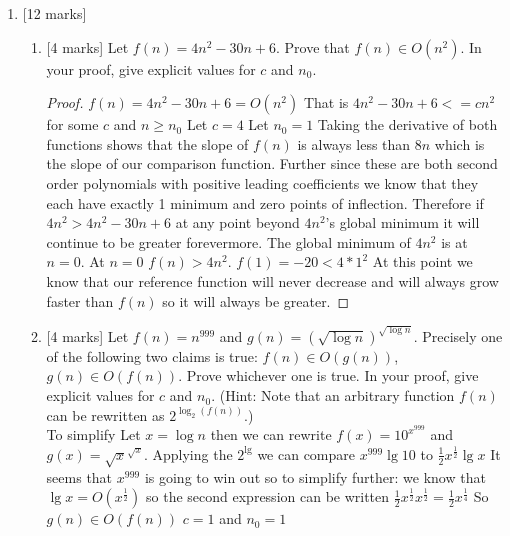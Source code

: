 \documentclass{article}
\begin{document}
\begin{enumerate}
    \item {[12 marks]} 
    \begin{enumerate}
        \item {[4 marks]} Let $f(n)=4n^2-30n+6$. Prove that $f(n)\in O(n^2)$. In your proof, give explicit values for $c$ and $n_0$.
\begin{proof}
$f(n)=4n^2-30n+6 = O(n^2)$ That is $4n^2-30n+6 <= cn^2$ for some $c$ and $n \geq n_0$
Let $c = 4$
Let $n_0 = 1$
Taking the derivative of both functions shows that the slope of $f(n)$ is always less than $8n$ which is the slope of our comparison function. Further since these are both second order polynomials with positive leading coefficients we know that they each have exactly 1 minimum and zero points of inflection. Therefore if $4n^2 > 4n^2-30n+6$ at any point beyond $4n^2$'s global minimum it will continue to be greater forevermore. The global minimum of $4n^2$ is at $n = 0$. At $n = 0$ $f(n) > 4n^2$. $f(1) = -20 < 4*1^2$ At this point we know that our reference function will never decrease and will always grow faster than $f(n)$ so it will always be greater. 
\end{proof}        

        \item {[4 marks]} Let $f(n)=n^{999}$ and $g(n)=(\sqrt{\log n})^{\sqrt{\log n}}$. Precisely one of the following two claims is true: $f(n)\in O(g(n))$,  $g(n)\in O(f(n))$. Prove whichever one is true. In your proof, give explicit values for $c$ and $n_0$. (Hint: Note that an arbitrary function $f(n)$ can be rewritten as $2^{\log_2(f(n))}$.)\\
        
To simplify Let $x = \log{n}$ then we can rewrite $f(x) = 10^{x^{999}}$ and $g(x) = \sqrt{x}^{\sqrt{x}}$. Applying the $2^{\lg}$ we can compare $x^{999}\lg10$ to $\frac{1}{2}x^{\frac{1}{2}}\lg x$ It seems that $x^{999}$ is going to win out so to simplify further: we know that $\lg x = O(x^{\frac{1}{2}})$ so the second expression can be written $\frac{1}{2}x^{\frac{1}{2}}x^{\frac{1}{2}} = \frac{1}{2}x^{\frac{1}{4}}$ So $g(n)\in O(f(n))$ $c = 1$ and $n_0 = 1$



\end{enumerate}
\end{enumerate}
\end{document}
